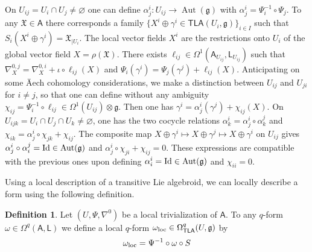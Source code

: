 \documentclass[number]{elsarticle}
\theoremstyle{definition}
\newtheorem{definition}[theorem]{Definition}
\theoremstyle{remark}
\numberwithin{equation}{section}
\begin{document}
On $U_{ij} = U_i \cap U_j \neq {{\varnothing}}$ one can define $\alpha^{i}_{j} : U_{ij} \rightarrow \operatorname{Aut}({{\mathfrak g}})$ with $\alpha^{i}_{j} = \Psi_i^{-1} \circ \Psi_j$. To any ${{\mathfrak X}} \in {{{{\mathbf{\mathsf{{A}}}}}}}$ there corresponds a family $\{ X^i \oplus \gamma^i \in {{{{\mathbf{\mathsf{{TLA}}}}}}}(U_i, {{\mathfrak g}})\}_{i \in I}$ such that $S_i(X^i \oplus \gamma^i) = {{\mathfrak X}}_{|U_i}$. The local vector fields $X^i$ are the restrictions onto $U_i$ of the global vector field $X = \rho({{\mathfrak X}})$. There exists $\ell_{ij} \in \Omega^1({{{{\mathbf{\mathsf{{A}}}}}}}_{U_{ij}}, {{{{\mathbf{\mathsf{{L}}}}}}}_{U_{ij}})$ such that $\nabla^{0,j}_X = \nabla^{0,i}_X + \iota \circ \ell_{ij}(X)$ and $\Psi_i(\gamma^i) = \Psi_j(\gamma^j) + \ell_{ij}(X)$. Anticipating on some Äech cohomology considerations, we make a distinction between $U_{ij}$ and $U_{ji}$ for $i \neq j$, so that one can define without any ambiguity $\chi_{ij} = \Psi_i^{-1} \circ \ell_{ij} \in \Omega^1(U_{ij}) \otimes {{\mathfrak g}}$. Then one has $\gamma^i = \alpha^{i}_{j}(\gamma^j) + \chi_{ij}(X)$. On $U_{ijk} = U_i \cap U_j \cap U_k \neq {{\varnothing}}$, one has the two cocycle relations $\alpha^{i}_{k} = \alpha^{i}_{j} \circ \alpha^{j}_{k}$ and $\chi_{ik} = \alpha^{i}_{j} \circ \chi_{jk} + \chi_{ij}$. The composite map $X \oplus \gamma^i \mapsto X \oplus \gamma^j \mapsto X \oplus \gamma^i$ on $U_{ij}$ gives $\alpha^{i}_{j} \circ \alpha^{j}_{i} = {{\text{\textup{Id}}}} \in \operatorname{Aut}({{\mathfrak g}})$ and $\alpha^{i}_{j} \circ \chi_{ji} + \chi_{ij} = 0$.
These expressions are compatible with the previous ones upon defining $\alpha^{i}_{i} = {{\text{\textup{Id}}}} \in \operatorname{Aut}({{\mathfrak g}})$ and $\chi_{ii} = 0$.

Using a local description of a transitive Lie algebroid, we can locally describe a form using the following definition.

\begin{definition}
\label{def-traivializationofforms}
Let $(U, \Psi, \nabla^0)$ be a local trivialization of ${{{{\mathbf{\mathsf{{A}}}}}}}$. To any $q$-form $\omega \in \Omega^q({{{{\mathbf{\mathsf{{A}}}}}}}, {{{{\mathbf{\mathsf{{L}}}}}}})$ we define a local $q$-form $\omega_{{\text{\textup{loc}}}} \in \Omega^q_{{{{\mathbf{\mathsf{{TLA}}}}}}}(U,{{\mathfrak g}})$ by
\begin{equation*}
\omega_{{\text{\textup{loc}}}} = \Psi^{-1} \circ \omega \circ S
\end{equation*}
\end{definition}
\end{document}
